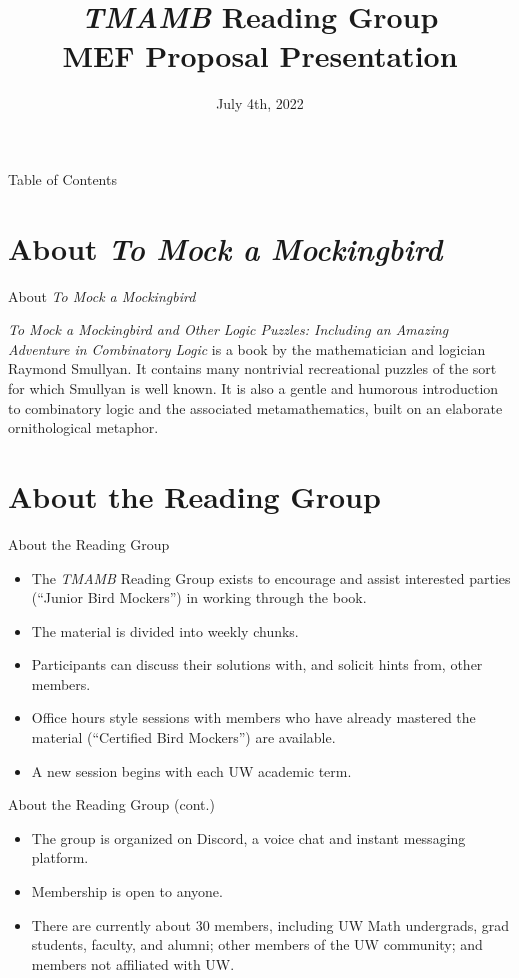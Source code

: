 \documentclass{beamer}
\title{\emph{TMAMB} Reading Group \\ MEF Proposal Presentation}
\author{}
\date{July 4th, 2022}
\begin{document}
\maketitle

\begin{frame}{Table of Contents}
\tableofcontents
\end{frame}

\section{About \emph{To Mock a Mockingbird}}
\begin{frame}{About \emph{To Mock a Mockingbird}}
  \begin{exampleblock}{}
  {\emph{To Mock a Mockingbird and Other Logic Puzzles: Including an Amazing Adventure in Combinatory Logic} is a book by the mathematician and logician Raymond Smullyan. It contains many nontrivial recreational puzzles of the sort for which Smullyan is well known. It is also a gentle and humorous introduction to combinatory logic and the associated metamathematics, built on an elaborate ornithological metaphor.}
\end{exampleblock}
\end{frame}

\section{About the Reading Group}
\begin{frame}{About the Reading Group}
  \begin{itemize}
  \pause
    \item The \emph{TMAMB} Reading Group exists to encourage and assist interested parties (``Junior Bird Mockers'') in working through the book. \pause
    \item The material is divided into weekly chunks. \pause
    \item Participants can discuss their solutions with, and solicit hints from, other members. \pause
    \item Office hours style sessions with members who have already mastered the material (``Certified Bird Mockers'') are available. \pause
    \item A new session begins with each UW academic term.
  \end{itemize}
\end{frame}

\begin{frame}{About the Reading Group (cont.)}
  \begin{itemize}
  \pause
    \item The group is organized on Discord, a voice chat and instant messaging platform. \pause
    \item Membership is open to anyone. \pause
    \item There are currently about 30 members, including UW Math undergrads, grad students, faculty, and alumni; other members of the UW community; and members not affiliated with UW.
  \end{itemize}
\end{frame}
\end{document}
